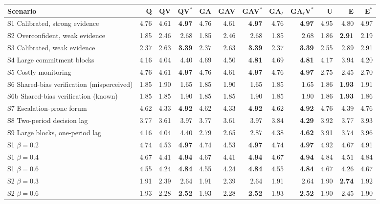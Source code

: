 \begin{tabular}{@{}lrrrrrrrrrrr@{}}
\toprule
Scenario & Q & QV & QV$^{*}$ & GA & GAV & GAV$^{*}$ & GA$_\ell$ & GA$_\ell$V$^{*}$ & U & E & E$^{*}$ \\
\midrule
S1 Calibrated, strong evidence & 4.76 & 4.61 & \textbf{4.97} & 4.76 & 4.61 & \textbf{4.97} & 4.76 & \textbf{4.97} & 4.95 & 4.80 & 4.97 \\
S2 Overconfident, weak evidence & 1.85 & 2.46 & 2.68 & 1.85 & 2.46 & 2.68 & 1.85 & 2.68 & 1.86 & \textbf{2.91} & 2.19 \\
S3 Calibrated, weak evidence & 2.37 & 2.63 & \textbf{3.39} & 2.37 & 2.63 & \textbf{3.39} & 2.37 & \textbf{3.39} & 2.55 & 2.89 & 2.91 \\
S4 Large commitment blocks & 4.16 & 4.04 & 4.40 & 4.69 & 4.50 & \textbf{4.81} & 4.69 & \textbf{4.81} & 4.17 & 3.94 & 4.20 \\
S5 Costly monitoring & 4.76 & 4.61 & \textbf{4.97} & 4.76 & 4.61 & \textbf{4.97} & 4.76 & \textbf{4.97} & 2.75 & 2.45 & 2.70 \\
S6 Shared-bias verification (misperceived) & 1.85 & 1.90 & 1.65 & 1.85 & 1.90 & 1.65 & 1.85 & 1.65 & 1.86 & \textbf{1.93} & 1.91 \\
S6b Shared-bias verification (known) & 1.85 & 1.85 & 1.90 & 1.85 & 1.85 & 1.90 & 1.85 & 1.90 & 1.86 & \textbf{1.93} & 1.86 \\
S7 Escalation-prone forum & 4.62 & 4.33 & \textbf{4.92} & 4.62 & 4.33 & \textbf{4.92} & 4.62 & \textbf{4.92} & 4.76 & 4.39 & 4.76 \\
S8 Two-period decision lag & 3.77 & 3.61 & 3.97 & 3.77 & 3.61 & 3.97 & 3.84 & \textbf{4.29} & 3.92 & 3.77 & 3.93 \\
S9 Large blocks, one-period lag & 4.16 & 4.04 & 4.40 & 2.79 & 2.65 & 2.87 & 4.38 & \textbf{4.62} & 3.91 & 3.74 & 3.96 \\
S1 $\beta=$0.2 & 4.74 & 4.53 & \textbf{4.97} & 4.74 & 4.53 & \textbf{4.97} & 4.74 & \textbf{4.97} & 4.92 & 4.67 & 4.91 \\
S1 $\beta=$0.4 & 4.67 & 4.41 & \textbf{4.94} & 4.67 & 4.41 & \textbf{4.94} & 4.67 & \textbf{4.94} & 4.84 & 4.51 & 4.84 \\
S1 $\beta=$0.6 & 4.55 & 4.24 & \textbf{4.84} & 4.55 & 4.24 & \textbf{4.84} & 4.55 & \textbf{4.84} & 4.67 & 4.26 & 4.67 \\
S2 $\beta=$0.3 & 1.91 & 2.39 & 2.64 & 1.91 & 2.39 & 2.64 & 1.91 & 2.64 & 1.90 & \textbf{2.74} & 1.92 \\
S2 $\beta=$0.6 & 1.93 & 2.28 & \textbf{2.52} & 1.93 & 2.28 & \textbf{2.52} & 1.93 & \textbf{2.52} & 1.90 & 2.45 & 1.90 \\
\bottomrule
\end{tabular}